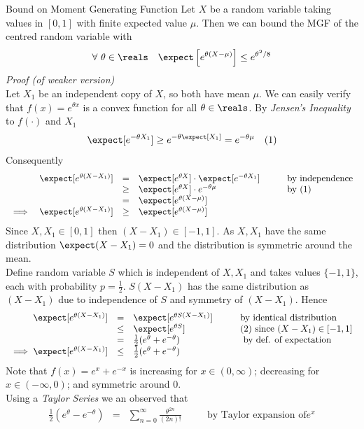 \documentclass[11pt,a4paper]{article}
\begin{document}
\begin{theorem}{Bound on Moment Generating Function}
  Let $X$ be a random variable taking values in $[0,1]$ with finite expected value $\mu$. Then we can bound the MGF of the centred random variable with
  \[ \forall\ \theta\in\reals\quad\expect\left[e^{\theta(X-\mu)}\right]\leq e^{\theta^2/8} \]
  \textit{Proof (of weaker version)}\\
  Let $X_1$ be an independent copy of $X$, so both have mean $\mu$. We can easily verify that $f(x)=e^{\theta x}$ is a convex function for all $\theta\in\reals$. By \textit{Jensen's Inequality} to $f(\cdot)$ and $X_1$
  \[ \expect[e^{-\theta X_1}]\geq e^{-\theta\expect[X_1]}=e^{-\theta\mu}\quad(1) \]
  Consequently
  \[\begin{array}{rrclll}
  &\expect[e^{\theta(X-X_1)}]&=&\expect[e^{\theta X}]\cdot\expect[e^{-\theta X_1}]&\quad&\text{by independence}\\
  &&\geq&\expect[e^{\theta X}]\cdot e^{-\theta\mu}&&\text{by (1)}\\
  &&=&\expect[e^{\theta(X-\mu)}]\\
  \implies&\expect[e^{\theta(X-X_1)}]&\geq&\expect[e^{\theta(X-\mu)}]
  \end{array}\]
  Since $X,X_1\in[0,1]$ then $(X-X_1)\in[-1,1]$. As $X,X_1$ have the same distribution $\expect(X-X_1)=0$ and the distribution is symmetric around the mean.\\
  Define random variable $S$ which is independent of $X,X_1$ and takes values $\{-1,1\}$, each with probability $p=\frac12$. $S(X-X_1)$ has the same distribution as $(X-X_1)$ due to independence of $S$ and symmetry of $(X-X_1)$. Hence
  \[\begin{array}{rclll}
    \expect[e^{\theta(X-X_1)}]&=&\expect[e^{\theta S(X-X_1)}]&\quad&\text{by identical distribution}\\
    &\leq&\expect[e^{\theta S}]&&(2)\text{ since }(X-X_1)\in[-1,1]\\
    &=&\frac12(e^\theta+e^{-\theta})&&\text{ by def. of expectation}\\
    \implies\expect[e^{\theta(X-X_1)}]&\leq&\frac12(e^\theta+e^{-\theta})
  \end{array}\]
  Note that $f(x)=e^x+e^{-x}$ is increasing for $x\in(0,\infty)$; decreasing for $x\in(-\infty,0)$; and symmetric around $0$.\\
  Using a \textit{Taylor Series} we an observed that
  \[\begin{array}{rclll}
  \frac12(e^\theta-e^{-\theta})&=&{\displaystyle\sum_{n=0}^\infty}\frac{\theta^{2n}}{(2n)!}&\quad&\text{by Taylor expansion of}e^x\\

\end{array}\]
\end{theorem}
\end{document}
